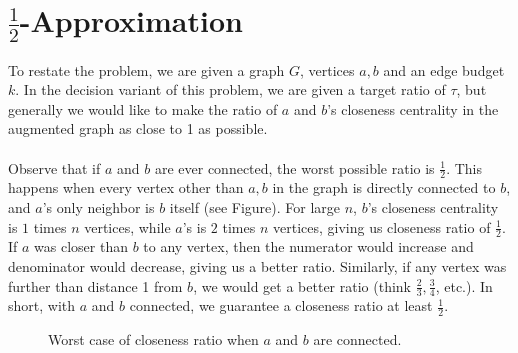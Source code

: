 \section{$\frac{1}{2}$-Approximation}
To restate the problem, we are given a graph $G$, vertices $a,b$ and an edge budget $k$. In the decision variant of this problem, we are given a target ratio of $\tau$, but generally we would like to make the ratio of $a$ and $b$'s closeness centrality in the augmented graph as close to 1 as possible. \\\\
Observe that if $a$ and $b$ are ever connected, the worst possible ratio is $\frac{1}{2}$. This happens when every vertex other than $a,b$ in the graph is directly connected to $b$, and $a$'s only neighbor is $b$ itself (see Figure). For large $n$, $b$'s closeness centrality is $1$ times $n$ vertices, while $a$'s is $2$ times $n$ vertices, giving us closeness ratio of $\frac{1}{2}$. If $a$ was closer than $b$ to any vertex, then the numerator would increase and denominator would decrease, giving us a better ratio. Similarly, if any vertex was further than distance 1 from $b$, we would get a better ratio (think $\frac{2}{3},\frac{3}{4}$, etc.). In short, with $a$ and $b$ connected, we guarantee a closeness ratio at least $\frac{1}{2}$.
\begin{figure}
    \centering
    \caption{Worst case of closeness ratio when $a$ and $b$ are connected.}\label{2-apx}
\end{figure}\\\\
